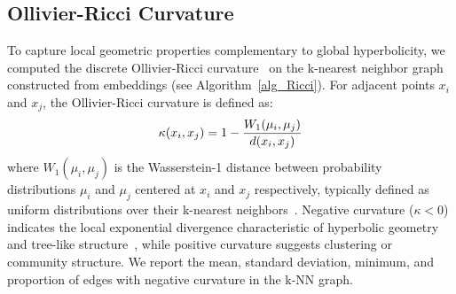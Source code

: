 \documentclass[]{Liebert_Author_revised}
\begin{document}
\subsection{Ollivier-Ricci Curvature}
To capture local geometric properties complementary to global hyperbolicity, we computed the discrete Ollivier-Ricci curvature~\citeauthor{ollivier2009ricci} on the k-nearest neighbor graph constructed from embeddings (see Algorithm~\ref{alg_Ricci}). 
For adjacent points $x_i$ and $x_j$, the Ollivier-Ricci curvature is defined as:
\begin{equation}
\scriptsize
\kappa(x_i, x_j) = 1 - \frac{W_1(\mu_i, \mu_j)}{d(x_i, x_j)}
\end{equation}
where $W_1(\mu_i, \mu_j)$ is the Wasserstein-1 distance between probability distributions $\mu_i$ and $\mu_j$ centered at $x_i$ and $x_j$ respectively, typically defined as uniform distributions over their k-nearest neighbors~\citeauthor{ni2015ricci}. Negative curvature ($\kappa < 0$) indicates the local exponential divergence characteristic of hyperbolic geometry and tree-like structure~\citeauthor{sandhu2015graph}, while positive curvature suggests clustering or community structure. We report the mean, standard deviation, minimum, and proportion of edges with negative curvature in the
k-NN graph.

\end{document}
